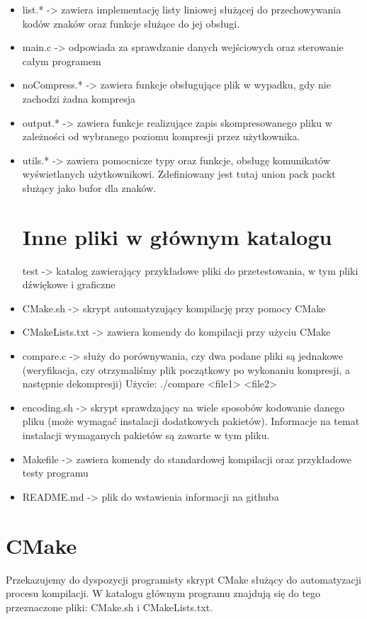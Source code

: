 \documentclass[]{article}
\begin{document}
\begin{itemize}
\item
list.* -> zawiera implementację listy liniowej służącej do przechowywania kodów znaków oraz funkcje służące do jej obsługi.
\item
main.c -> odpowiada za sprawdzanie danych wejściowych oraz sterowanie całym programem
\item
noCompress.* -> zawiera funkcje obsługujące plik w wypadku, gdy nie zachodzi żadna kompresja
\item
output.* -> zawiera funkcje realizujące zapis skompresowanego pliku w zależności od wybranego poziomu kompresji przez użytkownika.
\item
utils.* -> zawiera pomocnicze typy oraz funkcje, obsługę komunikatów wyświetlanych użytkownikowi. Zdefiniowany jest tutaj union pack pack\textunderscore t służący jako bufor dla znaków. 
\section{Inne pliki w głównym katalogu}\label{header-n231}
test -> katalog zawierający przykładowe pliki do przetestowania, w tym pliki dźwiękowe i graficzne
\item
CMake.sh -> skrypt automatyzujący kompilację przy pomocy CMake
\item
CMakeLists.txt -> zawiera komendy do kompilacji przy użyciu CMake
\item
compare.c -> służy do porównywania, czy dwa podane pliki są jednakowe (weryfikacja, czy otrzymaliśmy plik początkowy po wykonaniu kompresji, a następnie dekompresji) Użycie: ./compare <file1> <file2>
\item
encoding.sh -> skrypt sprawdzający na wiele sposobów kodowanie danego pliku (może wymagać instalacji dodatkowych pakietów). Informacje na temat instalacji wymaganych pakietów są zawarte w tym pliku.
\item
Makefile -> zawiera komendy do standardowej kompilacji oraz przykładowe testy programu
\item
README.md -> plik do wstawienia informacji na githuba

\end{itemize}

\section{CMake}\label{header-n231}
Przekazujemy do dyspozycji programisty skrypt CMake służący do automatyzacji procesu kompilacji. W katalogu głównym programu znajdują się do tego przeznaczone pliki: CMake.sh i CMakeLists.txt.
\end{document}
